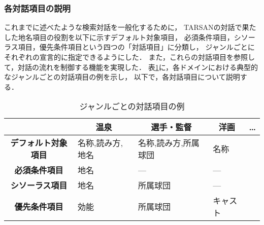 \subsubsection{各対話項目の説明}\label{sec:ditem}

これまでに述べたような検索対話を一般化するために，
TARSANの対話で果たした地名項目の役割を以下に示すデフォルト対象項目，
必須条件項目，シソーラス項目，優先条件項目という四つの「対話項目」に分類し，
ジャンルごとにそれぞれの宣言的に指定できるようにした．
また，これらの対話項目を参照して，対話の流れを制御する機能を実現した．
表\ref{tab:ditem}に，各ドメインにおける典型的なジャンルごとの対話項目の例を示し，
以下で，各対話項目について説明する．

\begin{table}[th]
\caption{ジャンルごとの対話項目の例}\label{tab:ditem}
\bigskip
\centering
\begin{tabular}{c|l|l|l|l}\hline\hline
& \multicolumn{1}{c|}{\bf 温泉}&
\multicolumn{1}{c|}{\bf 選手・監督}&
\multicolumn{1}{c|}{\bf 洋画}&
\multicolumn{1}{c}{\bf …}\rule{0pt}{10pt}\\ \hline
{\bf デフォルト対象項目} & 名称,読み方,地名& 名称,読み方,所属球団 & 名称 &\rule{0pt}{10pt}\\
{\bf 必須条件項目} & 地名 & --- & --- &\\
{\bf シソーラス項目} & 地名 & 所属球団 & ---&\\
{\bf 優先条件項目} & 効能 & 所属球団 & キャスト&\\
\hline\hline
\end{tabular}
\end{table}
